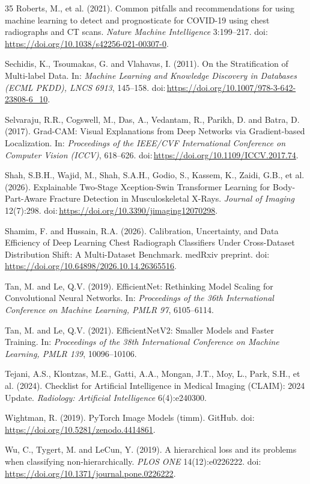 \begin{thebibliography}{35}
Roberts, M., et al. (2021). Common pitfalls and recommendations for using machine learning to detect and prognosticate for COVID-19 using chest radiographs and CT scans. \textit{Nature Machine Intelligence} 3:199--217. doi:\,\url{https://doi.org/10.1038/s42256-021-00307-0}.

Sechidis, K., Tsoumakas, G. and Vlahavas, I. (2011). On the Stratification of Multi-label Data. In: \textit{Machine Learning and Knowledge Discovery in Databases (ECML PKDD), LNCS 6913}, 145--158. doi:\,\url{https://doi.org/10.1007/978-3-642-23808-6_10}.

Selvaraju, R.R., Cogswell, M., Das, A., Vedantam, R., Parikh, D. and Batra, D. (2017). Grad-CAM: Visual Explanations from Deep Networks via Gradient-based Localization. In: \textit{Proceedings of the IEEE/CVF International Conference on Computer Vision (ICCV)}, 618--626. doi:\,\url{https://doi.org/10.1109/ICCV.2017.74}.

Shah, S.B.H., Wajid, M., Shah, S.A.H., Godio, S., Kassem, K., Zaidi, G.B., et al. (2026). Explainable Two-Stage Xception-Swin Transformer Learning for Body-Part-Aware Fracture Detection in Musculoskeletal X-Rays. \textit{Journal of Imaging} 12(7):298. doi:\,\url{https://doi.org/10.3390/jimaging12070298}.

Shamim, F. and Hussain, R.A. (2026). Calibration, Uncertainty, and Data Efficiency of Deep Learning Chest Radiograph Classifiers Under Cross-Dataset Distribution Shift: A Multi-Dataset Benchmark. medRxiv preprint. doi:\,\url{https://doi.org/10.64898/2026.10.14.26365516}.

Tan, M. and Le, Q.V. (2019). EfficientNet: Rethinking Model Scaling for Convolutional Neural Networks. In: \textit{Proceedings of the 36th International Conference on Machine Learning, PMLR 97}, 6105--6114.

Tan, M. and Le, Q.V. (2021). EfficientNetV2: Smaller Models and Faster Training. In: \textit{Proceedings of the 38th International Conference on Machine Learning, PMLR 139}, 10096--10106.

Tejani, A.S., Klontzas, M.E., Gatti, A.A., Mongan, J.T., Moy, L., Park, S.H., et al. (2024). Checklist for Artificial Intelligence in Medical Imaging (CLAIM): 2024 Update. \textit{Radiology: Artificial Intelligence} 6(4):e240300.

Wightman, R. (2019). PyTorch Image Models (timm). GitHub. doi:\,\url{https://doi.org/10.5281/zenodo.4414861}.

Wu, C., Tygert, M. and LeCun, Y. (2019). A hierarchical loss and its problems when classifying non-hierarchically. \textit{PLOS ONE} 14(12):e0226222. doi:\,\url{https://doi.org/10.1371/journal.pone.0226222}.
\end{thebibliography}
